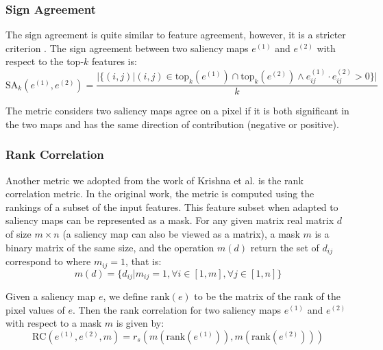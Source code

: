 \subsubsection{Sign Agreement}
The sign agreement is quite similar to feature agreement, however, it is a stricter criterion \cite{krishna_disagreement_problem}. The sign agreement between two saliency maps $e^{(1)}$ and $e^{(2)}$ with respect to the top-$k$ features is:
\begin{equation}
    \text{SA}_k(e^{(1)}, e^{(2)}) = \frac{|\{(i, j) | (i, j) \in \text{top}_{k}(e^{(1)}) \cap \text{top}_{k}(e^{(2)}) \land e^{(1)}_{ij} \cdot e^{(2)}_{ij} > 0\}|}{k}
\end{equation}

The metric considers two saliency maps agree on a pixel if it is both significant in the two maps and has the same direction of contribution (negative or positive).

\subsubsection{Rank Correlation}
Another metric we adopted from the work of Krishna et al. \cite{krishna_disagreement_problem} is the rank correlation metric. In the original work, the metric is computed using the rankings of a subset of the input features. This feature subset when adapted to saliency maps can be represented as a mask. For any given matrix real matrix $d$ of size $m \times n$ (a saliency map can also be viewed as a matrix), a mask $m$ is a binary matrix of the same size, and the operation $m(d)$ return the set of $d_{ij}$ correspond to where $m_{ij} = 1$, that is:
\begin{equation}
    m(d) = \{d_{ij} | m_{ij} = 1, \forall i \in [1, m], \forall j \in [1, n]\}
\end{equation}

Given a saliency map $e$, we define $\text{rank}(e)$ to be the matrix of the rank of the pixel values of $e$. Then the rank correlation for two saliency maps $e^{(1)}$ and $e^{(2)}$ with respect to a mask $m$ is given by:
\begin{equation}
    \text{RC}(e^{(1)}, e^{(2)}, m) = r_s\left(m(\text{rank}(e^{(1)})), m(\text{rank}(e^{(2)}))\right)
\end{equation}